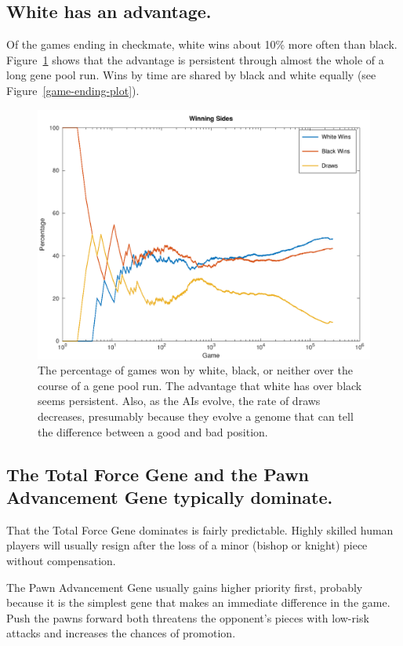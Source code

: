 \documentclass[letterpaper]{article}
\renewcommand{\_}{\allowbreak\textunderscore\allowbreak}
\begin{document}
\subsection{White has an advantage.}

Of the games ending in checkmate, white wins about 10\% more often than black. Figure~\ref{win-lose-plot} shows that the advantage is persistent through almost the whole of a long gene pool run. Wins by time are shared by black and white equally (see Figure~\ref{game-ending-plot}).
\begin{figure}[htb]
	\centering
	\includegraphics[width=\textwidth]{win-lose-plot}
	\caption{The percentage of games won by white, black, or neither over the course of a gene pool run. The advantage that white has over black seems persistent. Also, as the AIs evolve, the rate of draws decreases, presumably because they evolve a genome that can tell the difference between a good and bad position.}\label{win-lose-plot}
\end{figure}

\subsection{The Total Force Gene and the Pawn Advancement Gene typically dominate.}\label{total-force-and-pawn-result}

That the Total Force Gene dominates is fairly predictable. Highly skilled human players will usually resign after the loss of a minor (bishop or knight) piece without compensation.

The Pawn Advancement Gene usually gains higher priority first, probably because it is the simplest gene that makes an immediate difference in the game. Push the pawns forward both threatens the opponent's pieces with low-risk attacks and increases the chances of promotion.
\end{document}
